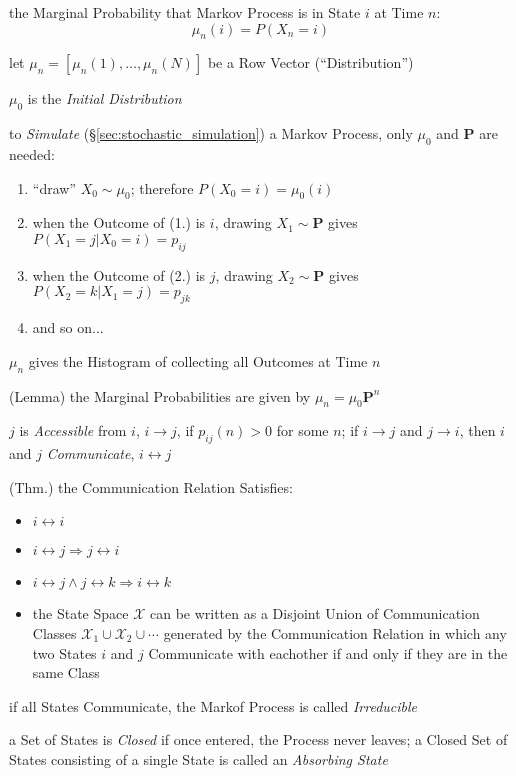 the Marginal Probability that Markov Process is in State $i$ at Time $n$:
\[
  \mu_n(i) = P(X_n = i)
\]

let $\mu_n = [\mu_n(1), \ldots, \mu_n(N)]$ be a Row Vector (``Distribution'')

$\mu_0$ is the \emph{Initial Distribution}

to \emph{Simulate} (\S\ref{sec:stochastic_simulation}) a Markov Process, only
$\mu_0$ and $\mathbf{P}$ are needed:
\begin{enumerate}
  \item ``draw'' $X_0 \sim \mu_0$; therefore $P(X_0 = i) = \mu_0(i)$
  \item when the Outcome of (1.) is $i$, drawing $X_1 \sim \mathbf{P}$ gives
    $P(X_1 = j | X_0 = i) = p_{ij}$
  \item when the Outcome of (2.) is $j$, drawing $X_2 \sim \mathbf{P}$ gives
    $P(X_2 = k | X_1 = j) = p_{jk}$
  \item and so on...
\end{enumerate}

$\mu_n$ gives the Histogram of collecting all Outcomes at Time $n$

(Lemma) the Marginal Probabilities are given by $\mu_n = \mu_0 \mathbf{P}^n$

$j$ is \emph{Accessible} from $i$, $i \to j$, if $p_{ij}(n) > 0$ for
some $n$; if $i \to j$ and $j \to i$, then $i$ and $j$
\emph{Communicate}, $i \leftrightarrow j$

(Thm.) the Communication Relation Satisfies:
\begin{itemize}
  \item $i \leftrightarrow i$
  \item $i \leftrightarrow j \Longrightarrow j \leftrightarrow i$
  \item $i \leftrightarrow j \wedge j \leftrightarrow k \Longrightarrow
    i \leftrightarrow k$
  \item the State Space $\mathcal{X}$ can be written as a Disjoint Union of
    Communication Classes $\mathcal{X}_1 \cup \mathcal{X}_2 \cup \cdots$
    generated by the Communication Relation in which any two States $i$ and $j$
    Communicate with eachother if and only if they are in the same Class
\end{itemize}

if all States Communicate, the Markof Process is called \emph{Irreducible}

a Set of States is \emph{Closed} if once entered, the Process never leaves; a
Closed Set of States consisting of a single State is called an \emph{Absorbing
  State}

